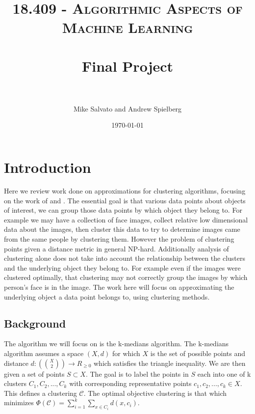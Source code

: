 \documentclass[paper=a4, fontsize=11pt]{scrartcl} %
\title{	
\normalfont \normalsize 
\textsc{18.409 - Algorithmic Aspects of Machine Learning} \\ [25pt] %
\horrule{0.5pt} \\[0.4cm] %
\huge Final Project \\ %
\horrule{2pt} \\[0.5cm] %
}
\author{Mike Salvato and Andrew Spielberg} %
\date{\normalsize\today} %
\numberwithin{equation}{section} %
\numberwithin{figure}{section} %
\numberwithin{table}{section} %
\begin{document}
\maketitle %

\section{Introduction}

Here we review work done on approximations for clustering algorithms, focusing on the work of \cite{firstpaper} and \cite{secondpaper}. The essential goal is that various data points about objects of interest, we can group those data points by which object they belong to. For example we may have a collection of face images, collect relative low dimensional data about the images, then cluster this data to try to determine images came from the same people by clustering them. However the problem of clustering points given a distance metric in general NP-hard. Additionally analysis of clustering alone does not take into account the relationship between the clusters and the underlying object they belong to. For example even if the images were clustered optimally, that clustering may not correctly group the images by which person's face is in the image. The work here will focus on approximating the underlying object a data point belongs to, using clustering methods.

\subsection{Background}

The algorithm we will focus on is the k-medians algorithm. The k-medians algorithm assumes a space $(X, d)$ for which $X$ is the set of possible points and distance $d : ({ X \choose 2}) \rightarrow R_{\geq 0}$ which satisfies the triangle inequality. We are then given a set of points $S \subset X$. The goal is to label the points in $S$ each into one of k clusters $C_1, C_2, ..., C_k$ with corresponding representative points $c_1, c_2, ..., c_k \in X$. This defines a clustering $\mathcal{C}$. The optimal objective clustering is that which minimizes $\Phi(\mathcal{C}) = \sum\limits_{i = 1}^k \sum_{x \in C_i} d(x, c_i)$.
\end{document}
